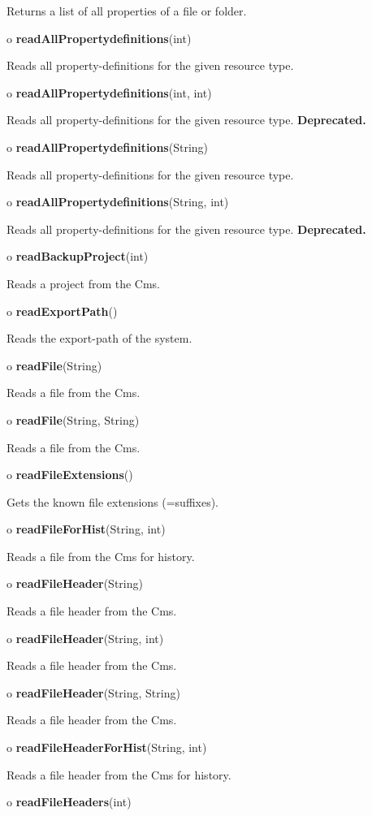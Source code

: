 \begin{description}
Returns a list of all properties of a file or folder.
\item o {\bf readAllPropertydefinitions}(int)

Reads all property-definitions for the given resource type.
\item o {\bf readAllPropertydefinitions}(int, int)

Reads all property-definitions for the given resource type. {\bf Deprecated.}

\item o {\bf readAllPropertydefinitions}(String)

Reads all property-definitions for the given resource type.
\item o {\bf readAllPropertydefinitions}(String, int)

Reads all property-definitions for the given resource type. {\bf Deprecated.}

\item o {\bf readBackupProject}(int)

Reads a project from the Cms.
\item o {\bf readExportPath}()

Reads the export-path of the system.
\item o {\bf readFile}(String)

Reads a file from the Cms.
\item o {\bf readFile}(String, String)

Reads a file from the Cms.
\item o {\bf readFileExtensions}()

Gets the known file extensions (=suffixes).
\item o {\bf readFileForHist}(String, int)

Reads a file from the Cms for history.
\item o {\bf readFileHeader}(String)

Reads a file header from the Cms.
\item o {\bf readFileHeader}(String, int)

Reads a file header from the Cms.
\item o {\bf readFileHeader}(String, String)

Reads a file header from the Cms.
\item o {\bf readFileHeaderForHist}(String, int)

Reads a file header from the Cms for history.
\item o {\bf readFileHeaders}(int)


\end{description}

